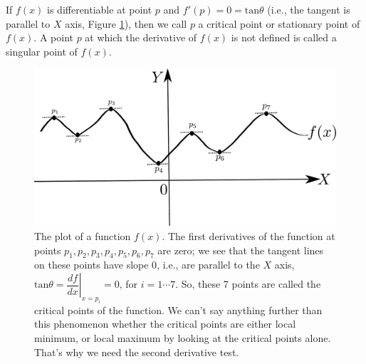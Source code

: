 \documentclass[conference,final,11pt,technote,onecolumn]{IEEEtran}\usepackage[]{graphicx}\usepackage[]{color}
\begin{document}
If $f(x)$ is differentiable at point $p$ and $f'(p)=0=\text{tan}\theta$ (i.e., the tangent is parallel to $X$ axis, Figure \ref{fig:derivative-3}), then we call $p$ a critical point or stationary point of $f(x)$. A point $p$ at which the derivative of $f(x)$ is not defined is called a singular point of $f(x)$.
\begin{figure}[!h]
	\centering
	\includegraphics[scale=0.5]{figures/derivative-3.pdf}
	\caption{The plot of a function $f(x)$. The first derivatives of the function at points $p_1, p_2, p_3, p_4, p_5, p_6, p_7$ are zero; we see that the tangent lines on these points have slope 0, i.e., are parallel to the $X$ axis, $\text{tan}\theta = \left.\dfrac{df}{dx}\right|_{x=p_i} = 0$, for $i=1\cdots 7$. So, these 7 points are called the critical points of the function. We can't say anything further than this phenomenon whether the critical points are either local minimum, or local maximum by looking at the critical points alone. That's why we need the second derivative test.\label{fig:derivative-3}}
\end{figure}
\end{document}
